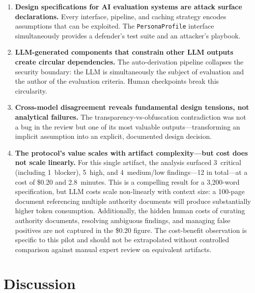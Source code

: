 \documentclass[11pt,a4paper]{article}
\begin{document}
\begin{enumerate}
  \item \textbf{Design specifications for AI evaluation systems are attack surface declarations.}
  Every interface, pipeline, and caching strategy encodes assumptions that can be exploited.
  The \texttt{PersonaProfile} interface simultaneously provides a defender's test suite and an attacker's playbook.

  \item \textbf{LLM-generated components that constrain other LLM outputs create circular dependencies.}
  The auto-derivation pipeline collapses the security boundary: the LLM is simultaneously the subject of evaluation and the author of the evaluation criteria.
  Human checkpoints break this circularity.

  \item \textbf{Cross-model disagreement reveals fundamental design tensions, not analytical failures.}
  The transparency-vs-obfuscation contradiction was not a bug in the review but one of its most valuable outputs---transforming an implicit assumption into an explicit, documented design decision.

  \item \textbf{The protocol's value scales with artifact complexity---but cost does not scale linearly.}
  For this single artifact, the analysis surfaced 3~critical (including 1~blocker), 5~high, and 4~medium/low findings---12 in total---at a cost of \$0.20 and 2.8~minutes.
  This is a compelling result for a 3{,}200-word specification, but LLM costs scale non-linearly with context size: a 100-page document referencing multiple authority documents will produce substantially higher token consumption.
  Additionally, the hidden human costs of curating authority documents, resolving ambiguous findings, and managing false positives are not captured in the \$0.20 figure.
  The cost-benefit observation is specific to this pilot and should not be extrapolated without controlled comparison against manual expert review on equivalent artifacts.
\end{enumerate}

\section{Discussion}

\end{document}
